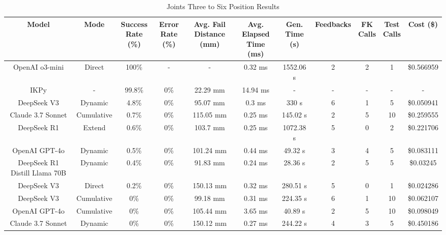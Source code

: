\begin{landscape}
\begin{table}[H]
\tiny
\renewcommand{\arraystretch}{1.2}
\caption{Joints Three to Six Position Results}
\begin{center}
\begin{tabular}{|c|c|c|c|c|c|c|c|c|c|c|}
    \hline
    \textbf{Model} & 
    \textbf{Mode} & 
    \makecell{\textbf{Success}\\\textbf{Rate (\%)}} &
    \makecell{\textbf{Error}\\\textbf{Rate (\%)}} &
    \makecell{\textbf{Avg. Fail}\\\textbf{Distance (mm)}} &
    \makecell{\textbf{Avg. Elapsed}\\\textbf{Time (ms)}} &
    \makecell{\textbf{Gen.}\\\textbf{Time (s)}} &
    \textbf{Feedbacks} &
    \makecell{\textbf{FK}\\\textbf{Calls}} &
    \makecell{\textbf{Test}\\\textbf{Calls}} &
    \textbf{Cost (\$)} \\
    \hline
    OpenAI o3-mini & Direct & 100\% & - & - & 0.32 ms & 1552.06 s & 2 & 2 & 1 & \$0.566959 \\
    \hline
    IKPy & - & 99.8\% & 0\% & 22.29 mm & 14.94 ms & - & - & - & - & - \\
    \hline
    DeepSeek V3 & Dynamic & 4.8\% & 0\% & 95.07 mm & 0.3 ms & 330 s & 6 & 1 & 5 & \$0.050941 \\
    \hline
    Claude 3.7 Sonnet & Cumulative & 0.7\% & 0\% & 115.05 mm & 0.25 ms & 145.02 s & 2 & 5 & 10 & \$0.259555 \\
    \hline
    DeepSeek R1 & Extend & 0.6\% & 0\% & 103.7 mm & 0.25 ms & 1072.38 s & 5 & 0 & 2 & \$0.221706 \\
    \hline
    OpenAI GPT-4o & Dynamic & 0.5\% & 0\% & 101.24 mm & 0.44 ms & 49.32 s & 3 & 4 & 5 & \$0.083111 \\
    \hline
    DeepSeek R1 Distill Llama 70B & Dynamic & 0.4\% & 0\% & 91.83 mm & 0.24 ms & 28.36 s & 2 & 5 & 5 & \$0.03245 \\
    \hline
    DeepSeek V3 & Direct & 0.2\% & 0\% & 150.13 mm & 0.32 ms & 280.51 s & 5 & 0 & 1 & \$0.024286 \\
    \hline
    DeepSeek V3 & Cumulative & 0\% & 0\% & 99.18 mm & 0.31 ms & 224.35 s & 6 & 1 & 10 & \$0.062107 \\
    \hline
    OpenAI GPT-4o & Cumulative & 0\% & 0\% & 105.44 mm & 3.65 ms & 40.89 s & 2 & 5 & 10 & \$0.098049 \\
    \hline
    Claude 3.7 Sonnet & Dynamic & 0\% & 0\% & 150.12 mm & 0.27 ms & 244.22 s & 4 & 3 & 5 & \$0.450186 \\

\end{tabular}
\end{center}
\end{table}
\end{landscape}

